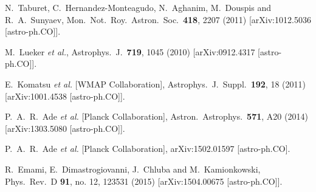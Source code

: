 \documentclass[aps,twocolumn,floats,prd,nofootinbib]{revtex4-1}
\begin{document}
\begin{thebibliography}{99}
  N.~Taburet, C.~Hernandez-Monteagudo, N.~Aghanim, M.~Douspis and R.~A.~Sunyaev,
  Mon.\ Not.\ Roy.\ Astron.\ Soc.\  {\bf 418}, 2207 (2011)
  [arXiv:1012.5036 [astro-ph.CO]].


  M.~Lueker {\it et al.},
  Astrophys.\ J.\  {\bf 719}, 1045 (2010)
  [arXiv:0912.4317 [astro-ph.CO]].


  E.~Komatsu {\it et al.} [WMAP Collaboration],
  Astrophys.\ J.\ Suppl.\  {\bf 192}, 18 (2011)
  [arXiv:1001.4538 [astro-ph.CO]].


  P.~A.~R.~Ade {\it et al.} [Planck Collaboration],
  Astron.\ Astrophys.\  {\bf 571}, A20 (2014)
  [arXiv:1303.5080 [astro-ph.CO]].


  P.~A.~R.~Ade {\it et al.} [Planck Collaboration],
  arXiv:1502.01597 [astro-ph.CO].


  R.~Emami, E.~Dimastrogiovanni, J.~Chluba and M.~Kamionkowski,
  Phys.\ Rev.\ D {\bf 91}, no. 12, 123531 (2015)
  [arXiv:1504.00675 [astro-ph.CO]].



\end{thebibliography}
\end{document}
